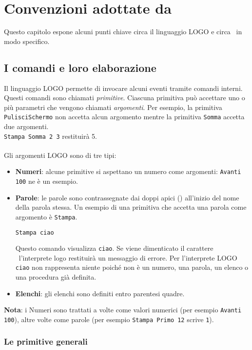 \chapter{Convenzioni adottate da \xlogo}

Questo capitolo espone alcuni punti chiave circa il linguaggio LOGO e circa \xlogo\ in modo specifico.


\section{I comandi e loro elaborazione}

Il linguaggio LOGO permette di invocare alcuni eventi tramite comandi interni. Questi comandi sono chiamati \textit{primitive}. Ciascuna primitiva può accettare uno o più parametri che vengono chiamati \textit{argomenti}. Per esempio, la primitiva \texttt{PulisciSchermo} non accetta alcun argomento mentre la primitiva \texttt{Somma} accetta due argomenti.\\
\texttt{Stampa Somma 2 3} restituirà 5.\\
\\
Gli argomenti LOGO sono di tre tipi:

\begin{itemize}
	\item \textbf{Numeri}: alcune primitive si aspettano un numero come argomenti: \texttt{Avanti 100} ne è un esempio. 
	\item \textbf{Parole}: le parole sono contrassegnate dai doppi apici (\textquotedbl ) all'inizio del nome della parola stessa. Un esempio di una primitiva che accetta una parola come argomento è \texttt{Stampa}. 
	\begin{center}
		\texttt{Stampa \textquotedbl ciao}
	\end{center}
	Questo comando visualizza \texttt{ciao}. Se viene dimenticato il carattere \textquotedbl\ l'interprete logo restituirà un messaggio di errore. Per l'interprete LOGO \texttt{ciao} non rappresenta niente poiché non è un numero, una parola, un elenco o una procedura già definita.
	\item \textbf{Elenchi}: gli elenchi sono definiti entro parentesi quadre.
\end{itemize}
\textbf{Nota}: i Numeri sono trattati a volte come valori numerici (per esempio \texttt{Avanti 100}), altre volte come parole (per esempio \texttt{Stampa Primo 12} scrive \texttt{1}). \\

\subsection{Le primitive generali}


